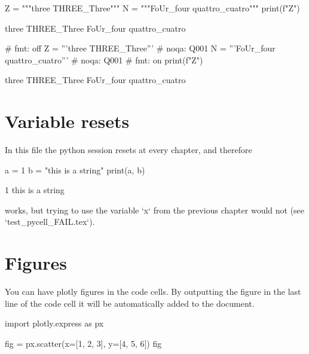 \documentclass[oneside]{book}
\begin{document}
\begin{pycell}
Z = """three
THREE_Three"""
N = """FoUr_four
quattro_cuatro"""
print(f"{Z}")
\end{pycell}
\begin{pyexpectedoutput}
three
THREE_Three
FoUr_four
quattro_cuatro
\end{pyexpectedoutput}

\begin{pycell}
# fmt: off
Z = '''three
THREE_Three'''  # noqa: Q001
N = '''FoUr_four
quattro_cuatro'''  # noqa: Q001
# fmt: on
print(f"{Z}")
\end{pycell}
\begin{pyexpectedoutput}
three
THREE_Three
FoUr_four
quattro_cuatro
\end{pyexpectedoutput}

\chapter{Variable resets}

\begin{mdcell}
In this file the python session resets at every chapter, and therefore
\end{mdcell}

\begin{pycell}
a = 1
b = "this is a string"
print(a, b)
\end{pycell}
\begin{pyexpectedoutput}
1 this is a string
\end{pyexpectedoutput}

\begin{mdcell}
works, but trying to use the variable `x` from the previous chapter would not (see `test_pycell_FAIL.tex`).
\end{mdcell}

\chapter{Figures}

\begin{mdcell}
You can have plotly figures in the code cells. By outputting the figure in the last line of the code cell it will be automatically added to the document.
\end{mdcell}

\begin{pycell}
import plotly.express as px

fig = px.scatter(x=[1, 2, 3], y=[4, 5, 6])
fig
\end{pycell}
\end{document}

